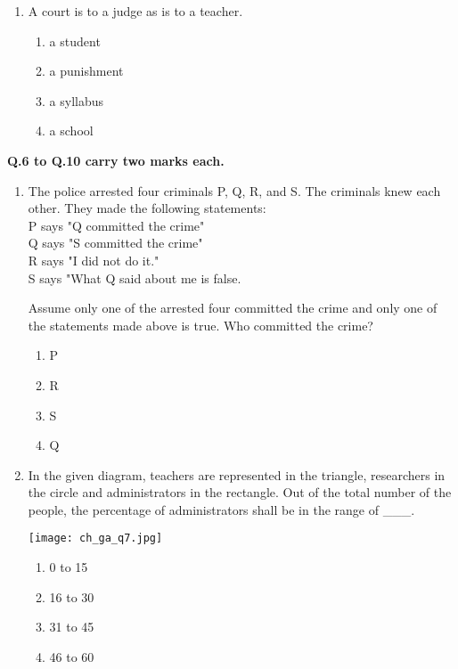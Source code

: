\documentclass[12pt]{article}
\begin{document}
\begin{enumerate}[label=Q.\arabic*]
\item A court is to a judge as \underline{\hspace{2cm}} is to a teacher.
\begin{multicols}{2}
\begin{enumerate}[label=(\Alph*)]
\item a student
\item a punishment
\item a syllabus
\item a school
\end{enumerate}
\end{multicols}
\end{enumerate}

\textbf{Q.6 to Q.10 carry two marks each.}

\begin{enumerate}[label=\textbf{Q.\arabic*}., start=6, leftmargin=*]
\item The police arrested four criminals  P, Q, R, and S. The criminals knew each other. They made the following statements:\\
\quad P says "Q committed the crime"\\
\quad Q says "S committed the crime"\\
\quad R says "I did not do it."\\
\quad S says "What Q said about me is false.

Assume only one of the arrested four committed the crime and only one of the statements made above is true. Who committed the crime?
\begin{multicols}{2}
\begin{enumerate}[label=(\Alph*)]
\item P
\item R
\item S
\item Q
\end{enumerate}
\end{multicols}

\item In the given diagram, teachers are represented in the triangle, researchers in the circle and administrators in the rectangle. Out of the total number of the people, the percentage of administrators shall be in the range of \_\_\_.

\begin{center}
	{
		\texttt{[image: ch\_ga\_q7.jpg]}
	}
\end{center}

\begin{multicols}{2}
\begin{enumerate}[label=(\Alph*)]
\item 0 to 15
\item 16 to 30
\item 31 to 45
\item 46 to 60
\end{enumerate}
\end{multicols}


\end{enumerate}
\end{document}
